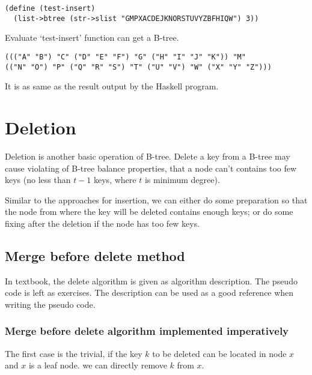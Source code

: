 \documentclass{article}
\begin{document}
\begin{lstlisting}
(define (test-insert)
  (list->btree (str->slist "GMPXACDEJKNORSTUVYZBFHIQW") 3))
\end{lstlisting}

Evaluate `test-insert' function can get a B-tree.

\begin{lstlisting}
((("A" "B") "C" ("D" "E" "F") "G" ("H" "I" "J" "K")) "M"
(("N" "O") "P" ("Q" "R" "S") "T" ("U" "V") "W" ("X" "Y" "Z")))
\end{lstlisting}

It is as same as the result output by the Haskell program.

\section{Deletion}

Deletion is another basic operation of B-tree. Delete a key from a
B-tree may cause violating of B-tree balance properties, that a node
can't contains too few keys (no less than $t-1$ keys, where $t$ is
minimum degree).

Similar to the approaches for insertion, we can either do some preparation
so that the node from where the key will be deleted contains enough
keys; or do some fixing after the deletion if the node has too few keys.


\subsection{Merge before delete method}

In textbook\cite{CLRS}, the delete algorithm is given as algorithm description.
The pseudo code is left as exercises. The description can be used
as a good reference when writing the pseudo code.

\subsubsection{Merge before delete algorithm implemented imperatively}

The first case is the trivial, if the key $k$ to be deleted
can be located in node $x$ and $x$ is a leaf node. we can directly
remove $k$ from $x$.
\end{document}
